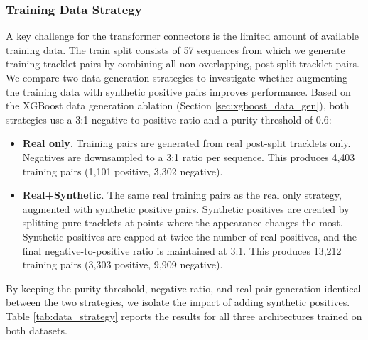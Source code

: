 \subsubsection{Training Data Strategy}\label{sec:transformer_data_strategy}
A key challenge for the transformer connectors is the limited amount of available training data. The train split consists of 57 sequences from which we generate training tracklet pairs by combining all non-overlapping, post-split tracklet pairs. We compare two data generation strategies to investigate whether augmenting the training data with synthetic positive pairs improves performance. Based on the XGBoost data generation ablation (Section \ref{sec:xgboost_data_gen}), both strategies use a 3:1 negative-to-positive ratio and a purity threshold of 0.6:

\begin{itemize}
    \item \textbf{Real only}. Training pairs are generated from real post-split tracklets only. Negatives are downsampled to a 3:1 ratio per sequence. This produces 4{,}403 training pairs (1{,}101 positive, 3{,}302 negative).

    \item \textbf{Real+Synthetic}. The same real training pairs as the real only strategy, augmented with synthetic positive pairs. Synthetic positives are created by splitting pure tracklets at points where the appearance changes the most. Synthetic positives are capped at twice the number of real positives, and the final negative-to-positive ratio is maintained at 3:1. This produces 13{,}212 training pairs (3{,}303 positive, 9{,}909 negative).
\end{itemize}

By keeping the purity threshold, negative ratio, and real pair generation identical between the two strategies, we isolate the impact of adding synthetic positives. Table \ref{tab:data_strategy} reports the results for all three architectures trained on both datasets.

